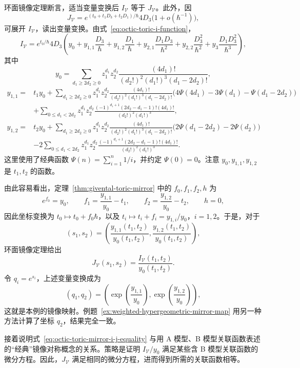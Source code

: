 \begin{example}
环面镜像定理断言，适当变量变换后 $I_{\mathcal V}$ 等于 $J_{\mathcal V}$。此外，因
\[
J_{\mathcal V}=e^{(t_0+t_1D_3+t_2D_1)/\hbar}4D_3\bigl(1+o(\hbar^{-1})\bigr),
\]
可展开 $I_{\mathcal V}$，读出变量变换。由式~\eqref{eq:octic-toric-i-function}，
\begin{equation}\label{eq:octic-toric-i-period-expansion}
I_{\mathcal V}=e^{t_0/\hbar}4D_3\left(y_0+y_{1,1}\frac{D_3}{\hbar}+y_{1,2}\frac{D_1}{\hbar}
+y_{2,1}\frac{D_1D_3}{\hbar^2}+y_{2,2}\frac{D_3^2}{\hbar^2}+y_3\frac{D_1D_3^2}{\hbar^3}\right),
\end{equation}
其中
\[
y_0=\sum_{d_1\ge2d_2\ge0}z_1^{d_1}z_2^{d_2}\frac{(4d_1)!}{(d_2!)^2(d_1!)^3(d_1-2d_2)!},
\]
\[
\begin{aligned}
y_{1,1}={}&t_1y_0+\sum_{d_1\ge2d_2\ge0}z_1^{d_1}z_2^{d_2}\frac{(4d_1)!}{(d_2!)^2(d_1!)^3(d_1-2d_2)!}
\bigl(4\Psi(4d_1)-3\Psi(d_1)-\Psi(d_1-2d_2)\bigr)\\
&+\sum_{0\le d_1<2d_2}z_1^{d_1}z_2^{d_2}\frac{(-1)^{d_1+1}(2d_2-d_1-1)!(4d_1)!}{(d_2!)^2(d_1!)^3},
\end{aligned}
\]
\[
\begin{aligned}
y_{1,2}={}&t_2y_0+\sum_{d_1\ge2d_2\ge0}z_1^{d_1}z_2^{d_2}\frac{(4d_1)!}{(d_2!)^2(d_1!)^3(d_1-2d_2)!}
\bigl(2\Psi(d_1-2d_2)-2\Psi(d_2)\bigr)\\
&-2\sum_{0\le d_1<2d_2}z_1^{d_1}z_2^{d_2}\frac{(-1)^{d_1+1}(2d_2-d_1-1)!(4d_1)!}{(d_2!)^2(d_1!)^3}.
\end{aligned}
\]
这里使用了经典函数 $\Psi(n)=\sum_{i=1}^n1/i$，并约定 $\Psi(0)=0$。注意 $y_0,y_{1,1},y_{1,2}$ 是 $t_1,t_2$ 的函数。

由此容易看出，定理~\ref{thm:givental-toric-mirror} 中的 $f_0,f_1,f_2,h$ 为
\[
e^{f_0}=y_0,\qquad f_1=\frac{y_{1,1}}{y_0}-t_1,\qquad f_2=\frac{y_{1,2}}{y_0}-t_2,\qquad h=0,
\]
因此坐标变换为 $t_0\mapsto t_0+f_0\hbar$，以及 $t_i\mapsto t_i+f_i=y_{1,i}/y_0$，$i=1,2$。于是，对于
\[
(s_1,s_2)=\left(\frac{y_{1,1}(t_1,t_2)}{y_0(t_1,t_2)},\frac{y_{1,2}(t_1,t_2)}{y_0(t_1,t_2)}\right),
\]
环面镜像定理给出
\begin{equation}\label{eq:octic-toric-mirror-i-j-equality}
J_{\mathcal V}(s_1,s_2)=\frac{I_{\mathcal V}(t_1,t_2)}{y_0(t_1,t_2)}.
\end{equation}
令 $q_i=e^{s_i}$，上述变量变换成为
\[
(q_1,q_2)=\left(\exp\left(\frac{y_{1,1}}{y_0}\right),\exp\left(\frac{y_{1,2}}{y_0}\right)\right),
\]
这就是本例的镜像映射。例题~\ref{ex:weighted-hypergeometric-mirror-map} 用另一种方法计算了坐标 $q_2$，结果完全一致。

接着说明式~\eqref{eq:octic-toric-mirror-i-j-equality} 与用 A 模型、B 模型关联函数表述的“经典”镜像对称概念的关系。策略是证明 $I_{\mathcal V}/y_0$ 满足某些含 B 模型关联函数的微分方程。因此，$J_{\mathcal V}$ 满足相同的微分方程，进而得到所需的关联函数相等。


\end{example}
